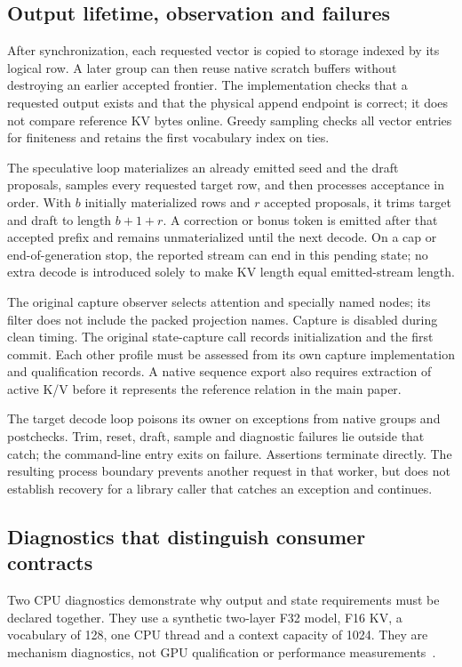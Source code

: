 \subsection{Output lifetime, observation and failures}
After synchronization, each requested vector is copied to storage indexed by its logical row. A later group can then reuse native scratch buffers without destroying an earlier accepted frontier. The implementation checks that a requested output exists and that the physical append endpoint is correct; it does not compare reference KV bytes online. Greedy sampling checks all vector entries for finiteness and retains the first vocabulary index on ties.

The speculative loop materializes an already emitted seed and the draft proposals, samples every requested target row, and then processes acceptance in order. With $b$ initially materialized rows and $r$ accepted proposals, it trims target and draft to length $b+1+r$. A correction or bonus token is emitted after that accepted prefix and remains unmaterialized until the next decode. On a cap or end-of-generation stop, the reported stream can end in this pending state; no extra decode is introduced solely to make KV length equal emitted-stream length.

The original capture observer selects attention and specially named nodes; its filter does not include the packed projection names. Capture is disabled during clean timing. The original state-capture call records initialization and the first commit. Each other profile must be assessed from its own capture implementation and qualification records. A native sequence export also requires extraction of active K/V before it represents the reference relation in the main paper.

The target decode loop poisons its owner on exceptions from native groups and postchecks. Trim, reset, draft, sample and diagnostic failures lie outside that catch; the command-line entry exits on failure. Assertions terminate directly. The resulting process boundary prevents another request in that worker, but does not establish recovery for a library caller that catches an exception and continues.

\subsection{Diagnostics that distinguish consumer contracts}
Two CPU diagnostics demonstrate why output and state requirements must be declared together. They use a synthetic two-layer F32 model, F16 KV, a vocabulary of 128, one CPU thread and a context capacity of 1024. They are mechanism diagnostics, not GPU qualification or performance measurements~\cite{records}.

